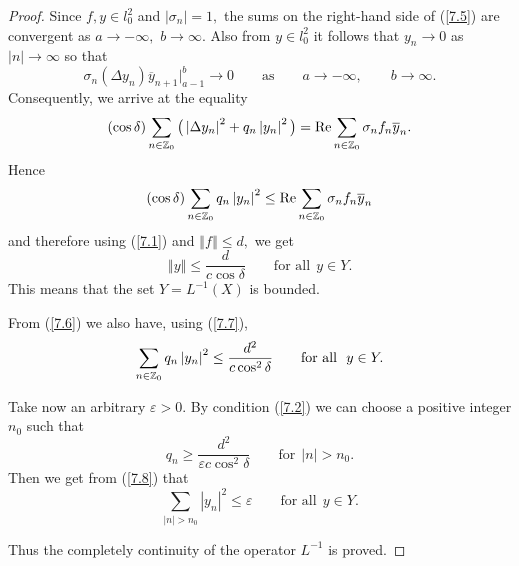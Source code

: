 \begin{proof}
Since $f,y\in l_{0}^{2}$ and $\left\vert \sigma _{n}\right\vert =1,$ the
sums on the right-hand side of (\ref{7.5}) are convergent as $a\rightarrow
-\infty ,$ $b\rightarrow \infty .$ Also from $y\in l_{0}^{2}$ it follows
that $y_{n}\rightarrow 0$ as $\left\vert n\right\vert \rightarrow \infty $
so that%
\[
\sigma _{n}(\Delta y_{n})\overline{y}_{n+1}\big|_{a-1}^{b}\rightarrow 0\qquad \text{as} \qquad a\rightarrow -\infty ,\qquad b\rightarrow \infty .
\]
Consequently, we arrive at the equality%
\[
(\cos \delta )\sum_{n\in
\mathbb{Z}
_{0}}\big( \left\vert \Delta y_{n}\right\vert ^{2}+q_{n}\left\vert
y_{n}\right\vert ^{2}\big) ={\rm Re}\sum_{n\in
\mathbb{Z}
_{0}}\sigma _{n}f_{n}\overline{y}_{n}.
\]%
Hence%
\begin{equation}
(\cos \delta )\sum_{n\in
\mathbb{Z}
_{0}}q_{n}\left\vert y_{n}\right\vert ^{2}\leq {\rm Re}\sum_{n\in
\mathbb{Z}
_{0}}\sigma _{n}f_{n}\overline{y}_{n}  \label{7.6}
\end{equation}%
and therefore using (\ref{7.1}) and $\left\Vert f\right\Vert \leq d,$ we get{\samepage
\begin{equation}
\left\Vert y\right\Vert \leq \frac{d}{c\cos \delta }\qquad \text{for all} \ \
y\in Y.  \label{7.7}
\end{equation}%
This means that the set $Y=L^{-1}(X)$ is bounded.}

From (\ref{7.6}) we also have, using (\ref{7.7}),%
\begin{equation}
\sum_{n\in \mathbf{%
\mathbb{Z}
}_{0}}q_{n}\left\vert y_{n}\right\vert ^{2}\leq \frac{d^{2}}{c\cos
^{2}\delta } \qquad \text{for all} \ \ y\in Y.  \label{7.8}
\end{equation}

Take now an arbitrary $\varepsilon >0$. By condition (\ref{7.2}) we can
choose a positive integer $n_{0}$ such that
\[
q_{n}\geq \frac{d^{2}}{\varepsilon c\cos ^{2}\delta } \qquad \text{for} \ \
\left\vert n\right\vert >n_{0}.
\]%
Then we get from (\ref{7.8}) that
\[
\sum_{\left\vert n\right\vert >n_{0}}\left\vert y_{n}\right\vert ^{2}\leq
\varepsilon \qquad \text{for all} \ \ y\in Y.
\]

Thus the completely continuity of the operator $L^{-1}$ is proved.
\end{proof}
